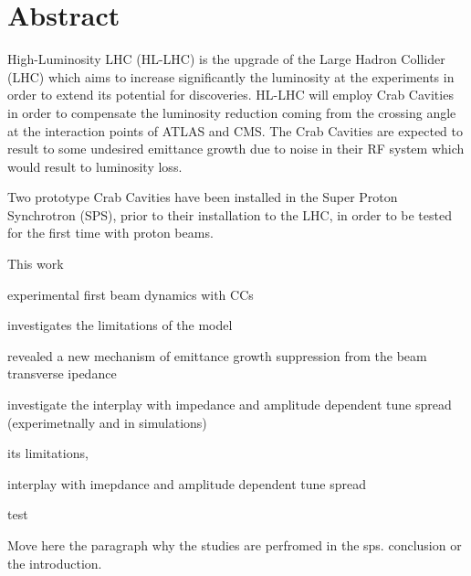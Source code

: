 \cleardoublepage
\chapter*{Abstract}

High-Luminosity LHC (HL-LHC) is the upgrade of the Large Hadron Collider (LHC) which aims to increase significantly the luminosity at the experiments in order to extend its potential for discoveries. HL-LHC will employ Crab Cavities in order to compensate the luminosity reduction coming from the crossing angle at the interaction points of ATLAS and CMS. The Crab Cavities are expected to result to some undesired emittance growth due to noise in their RF system which would result to luminosity loss. 

Two prototype Crab Cavities have been installed in the Super Proton Synchrotron (SPS), prior to their installation to the LHC, in order to be tested for the first time with proton beams.  


This work

experimental first beam dynamics with CCs

investigates the limitations of the model

revealed a new mechanism of emittance growth suppression from the beam transverse ipedance


investigate the interplay with impedance and amplitude dependent tune spread (experimetnally and in simulations)


its limitations, 

interplay with imepdance and amplitude dependent tune spread

test

Move here the paragraph why the studies are perfromed in the sps. conclusion or the introduction.

